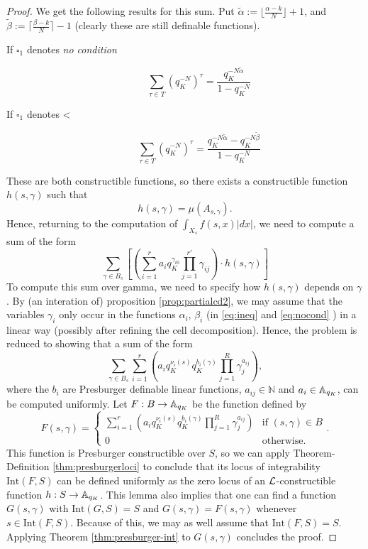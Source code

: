 \begin{proof}
We get the following results for this sum. 
Put $\tilde{\alpha}:= \lfloor\frac{\alpha -k}{N}\rfloor+1$, and $\tilde{\beta}:= \lceil\frac{\beta -k}{N}\rceil-1$ (clearly these are still definable functions). 

\begin{description}
\item[If $\square_{1}$ denotes \emph{no condition}]
\begin{equation}\label{eq:nocond}\sum_{\tau \in T} (q_K^{-N})^\tau = \frac{q_K^{-N\tilde{\alpha}}}{1-q_K^{-N}} \end{equation}
\item[If $\square_{1}$ denotes <]
\begin{equation}\label{eq:ineq}\sum_{\tau \in T} (q_K^{-N})^\tau = \frac{q_K^{-N\tilde{\alpha}}-q_K^{-N\tilde{\beta}}}{1-q_K^{-N}} \end{equation}
\end{description}
These are both constructible functions, so there exists a constructible function $h(s,\gamma)$ such that \[h(s,\gamma) = \mu(A_{s, \gamma}).\]
Hence, returning to the computation of $\int_{X_s} f(s,x)|dx|$, we need to compute a sum of the form
\[\sum_{\gamma \in B_s}\left[ \left(\sum_{i=1}^r a_i q_K^{\gamma_{i0}} \prod_{j=1}^{r'}\gamma_{ij}\right) \cdot h(s,\gamma)\right]\]
To compute this sum over gamma, we need to specify how $h(s,\gamma)$ depends on $\gamma$. 
By (an interation of) proposition \ref{prop:partialcd2}, we may assume that the variables $\gamma_i$ only occur in the functions $\alpha_i$, $\beta_i$ (in \eqref{eq:ineq} and \eqref{eq:nocond} ) in a { linear} way (possibly after refining the cell decomposition). Hence, the problem is reduced to showing that a sum of the form 
\[\sum_{\gamma \in B_s} \sum_{i=1}^r \left(a_i q_K^{\nu_i(s)}q_K^{b_i(\gamma)} \prod_{j=1}^{R}\gamma_{j}^{a_{ij}}\right),\]
where the $b_i$ are Presburger definable linear functions, %
$a_{ij} \in \mathbb{N}$ and $a_i \in \AA_{q_K}$, can be computed uniformly.
Let $F: B\to \AA_{q_K}$ be the function defined by
\[F(s,\gamma) = \left\{\begin{array}{ll}{\sum_{i=1}^r \left(a_i q_K^{\nu_i(s)}q_K^{b_i(\gamma)} \prod_{j=1}^{R}\gamma_{j}^{a_{ij}}\right)} & \text{if } (s,\gamma)\in B\\ 0 & \text{otherwise}.
\end{array}.\right.\]
This function is Presburger constructible over $S$, so we can apply
Theorem-Definition \ref{thm:presburgerloci} to conclude that its locus of integrability $\text{Int}(F,S)$ can be defined uniformly as the zero locus of an $\Lm$-constructible function $h: S\to \AA_{q_K}$. 
This lemma also implies that one can find a function $G(s,\gamma)$ with $\text{Int}(G,S)= S$ and $G(s,\gamma) = F(s,\gamma)$ whenever $s \in \text{Int}(F,S)$. Because of this, we may as well assume that $\text{Int}(F,S)=S$. Applying Theorem \ref{thm:presburger-int} to $G(s,\gamma)$ concludes the proof.
\end{proof}

